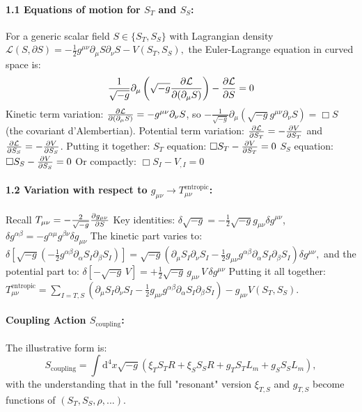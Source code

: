 \documentclass[11pt,a4paper]{article} %
\newcommand{\ST}{S_T}
\newcommand{\SSp}{S_S} %
\newcommand{\Scoupling}{S_{\text{coupling}}}
\newcommand{\Lm}{L_m}
\newcommand{\Tmu}{T} %
\newcommand{\Tmnentropic}{T^{\text{entropic}}_{\mu\nu}}
\begin{document}
\paragraph{1.1 Equations of motion for $\ST$ and $\SSp$: }
For a generic scalar field $S\in\{\ST,\SSp\}$ with Lagrangian density
$\mathcal{L}(S,\partial S)=-\frac{1}{2}g^{\mu\nu}\partial_\mu S\partial_\nu S-V(\ST,\SSp),$
the Euler-Lagrange equation in curved space is:
\begin{equation*}
\frac{1}{\sqrt{-g}}\partial_\mu\left(\sqrt{-g}\pdv{\mathcal{L}}{(\partial_\mu S)}\right)-\pdv{\mathcal{L}}{S}=0
\end{equation*}
Kinetic term variation: $\pdv{\mathcal{L}}{(\partial_\mu S)}=-g^{\mu\nu}\partial_\nu S$, so $-\frac{1}{\sqrt{-g}}\partial_\mu(\sqrt{-g}g^{\mu\nu}\partial_\nu S)=\Box S$ (the covariant d'Alembertian).
Potential term variation: $\pdv{\mathcal{L}}{\ST}=-\pdv{V}{\ST}$ and $\pdv{\mathcal{L}}{\SSp}=-\pdv{V}{\SSp}$.
Putting it together:
$\ST$ equation: $\Box\ST-\pdv{V}{\ST}=0$
$\SSp$ equation: $\Box\SSp-\pdv{V}{\SSp}=0$
Or compactly: $\Box S_I-V_{,I}=0$

\paragraph{1.2 Variation with respect to $g_{\mu\nu}\longrightarrow\Tmnentropic$:}
Recall $\Tmu_{\mu\nu}=-\frac{2}{\sqrt{-g}}\pdv{g_{\mu\nu}}{S}$
Key identities: $\delta\sqrt{-g}=-\frac{1}{2}\sqrt{-g}g_{\mu\nu}\delta g^{\mu\nu}$, $\delta g^{\alpha\beta}=-g^{\alpha\mu}g^{\beta\nu}\delta g_{\mu\nu}$
The kinetic part varies to: \\
$\delta\left[\sqrt{-g}\left(-\frac{1}{2}g^{\alpha\beta}\partial_\alpha S_I\partial_\beta S_I\right)\right]=\sqrt{-g}\left(\partial_\mu S_I\partial_\nu S_I-\frac{1}{2}g_{\mu\nu}g^{\alpha\beta}\partial_\alpha S_I\partial_\beta S_I\right)\delta g^{\mu\nu},$
and the potential part to:
$\delta[-\sqrt{-g}\,V]=+\frac{1}{2}\sqrt{-g}\,g_{\mu\nu}\,V\,\delta g^{\mu\nu}$
Putting it all together: \\
$\Tmnentropic=\sum_{I=T,S}\left(\partial_\mu S_I\partial_\nu S_I-\frac{1}{2}g_{\mu\nu}g^{\alpha\beta}\partial_\alpha S_I\partial_\beta S_I\right)-g_{\mu\nu}V(\ST,\SSp).$

\paragraph{Coupling Action $\Scoupling$:}
The illustrative form is:
\begin{equation}
\Scoupling=\int\text{d}^4x\sqrt{-g}(\xi_T\ST R+\xi_S\SSp R+g_T\ST\Lm+g_S\SSp\Lm) ,
\end{equation}
with the understanding that in the full "resonant" version $\xi_{T,S}$ and $g_{T,S}$ become functions of $(\ST,\SSp,\rho,...)$.
\end{document}
